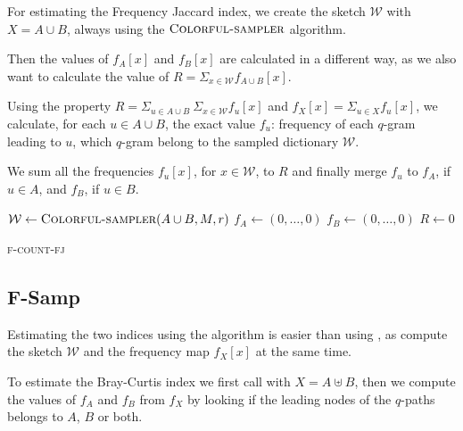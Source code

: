 For estimating the Frequency Jaccard index, we create the sketch $\mathcal{W}$ with $X = A \cup B$, always using the $\textsc{Colorful-sampler}$ algorithm. 

Then the values of $f_{A}[x]$ and $f_{B}[x]$ are calculated in a different way, as we also want to calculate the value of $R = \Sigma_{x \in \mathcal{W}} f_{A \cup B}[x]$.

Using the property $R = \Sigma_{u \in A \cup B}\ \Sigma_{x \in \mathcal{W}} f_{u}[x] $ and $f_{X}[x] = \Sigma_{u \in X}{ f_{u}[x] }$, we calculate, for each $u \in A \cup B$, the exact value $f_{u}$: frequency of each $q$-gram leading to $u$, which $q$-gram belong to the sampled dictionary $\mathcal{W}$.

We sum all the frequencies $f_u[x]$, for $x \in \mathcal{W}$, to $R$ and finally merge $f_{u}$ to $f_A$, if $u \in A$, and $f_B$, if $u \in B$.

\begin{algorithm}[h]
	\small
	\DontPrintSemicolon
	\BlankLine
	$\mathcal{W} \gets \textsc{Colorful-sampler}(A \cup B, M, r)$ \;
	$f_A \gets (0,\ldots,0)$\;
	$f_B \gets (0,\ldots,0)$\;
	$R \gets 0$\;
	\BlankLine
	\BlankLine
	\caption{\textsc{f-count-fj}}
	\label{alg:f-count-fj}
\end{algorithm}

\subsection*{F-Samp}

Estimating the two indices using the \fsamp algorithm is easier than using \fcount, as \fsamp compute the sketch $\mathcal{W}$ and the frequency map $f_X[x]$ at the same time.\medskip

To estimate the Bray-Curtis index we first call \fsamp with $X = A \uplus B$, then we compute the values of $f_A$ and $f_B$ from $f_X$ by looking if the leading nodes of the $q$-paths belongs to $A$, $B$ or both.

